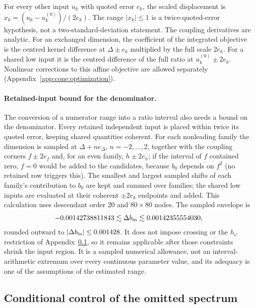 \documentclass[11pt,a4paper]{article}
\numberwithin{equation}{section}
\begin{document}
For every other input $u_k$ with quoted error $e_k$, the scaled displacement is $x_k=(u_k-u_k^{(0)})/(2e_k)$. The range
$|x_k|\le1$ is a twice-quoted-error hypothesis, not a two-standard-deviation statement. The coupling derivatives are
analytic. For an exchanged dimension, the coefficient of the integrated objective is the centred kernel difference at
$\Delta\pm e_k$ multiplied by the full scale $2e_k$. For a shared low input it is the centred difference of the full
ratio at $u_k^{(0)}\pm2e_k$. Nonlinear corrections to this affine objective are allowed separately
(Appendix~\ref{app:cone:optimization}).

\paragraph{Retained-input bound for the denominator.} The conversion of a numerator range into a ratio interval also
needs a bound on the denominator. Every retained independent input is placed within twice its quoted error, keeping
shared quantities coherent. For each nonleading family the dimension is sampled at $\Delta+ne_\Delta$, $n=-2,\dots,2$,
together with the coupling corners $f\pm2e_f$ and, for an even family, $h\pm2e_h$; if the interval of $f$ contained
zero, $f=0$ would be added to the candidates, because $b_0$ depends on $f^2$ (no retained row triggers this). The
smallest and largest sampled shifts of each family's contribution to $b_0$ are kept and summed over families; the
shared low inputs are evaluated at their coherent $\pm2e_k$ endpoints and added. This calculation uses descendant order
20 and $80\times80$ nodes. The sampled envelope is
\begin{equation}
 -0.00142738811843\lesssim\Delta b_{\rm in}\lesssim0.00142355554030,
 \label{eq:cone:denbox}
\end{equation}
rounded outward to $|\Delta b_{\rm in}|\le0.001428$. It does not impose crossing or the $h_{\epsilon'}$ restriction of
Appendix~\ref{app:cone:tails}, so it remains applicable after those constraints shrink the input region. It is a sampled
numerical allowance, not an interval-arithmetic extremum over every continuous parameter value, and its adequacy is one
of the assumptions of the estimated range.

\subsection{Conditional control of the omitted spectrum}\label{app:cone:tails}
\end{document}
